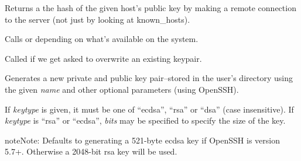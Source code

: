 \documentclass[letterpaper,10pt,openany]{sphinxmanual}
\begin{document}

\begin{fulllineitems}
\label{Applications/terminal/plugin_ssh:ssh.get_host_fingerprint}
Returns a the hash of the given host's public key by making a remote
connection to the server (not just by looking at known\_hosts).

\end{fulllineitems}


\begin{fulllineitems}
\label{Applications/terminal/plugin_ssh:ssh.generate_new_keypair}
Calls {\hyperref[Applications/terminal/plugin_ssh:ssh.openssh_generate_new_keypair]{}} or
{\hyperref[Applications/terminal/plugin_ssh:ssh.dropbear_generate_new_keypair]{}} depending on what's available on the
system.

\end{fulllineitems}


\begin{fulllineitems}
\label{Applications/terminal/plugin_ssh:ssh.overwrite}
Called if we get asked to overwrite an existing keypair.

\end{fulllineitems}


\begin{fulllineitems}
\label{Applications/terminal/plugin_ssh:ssh.openssh_generate_new_keypair}
Generates a new private and public key pair--stored in the user's directory
using the given \emph{name} and other optional parameters (using OpenSSH).

If \emph{keytype} is given, it must be one of ``ecdsa'', ``rsa'' or ``dsa'' (case
insensitive).  If \emph{keytype} is ``rsa'' or ``ecdsa'', \emph{bits} may be specified to
specify the size of the key.

\begin{notice}{note}{Note:}
Defaults to generating a 521-byte ecdsa key if OpenSSH is version 5.7+. Otherwise a 2048-bit rsa key will be used.
\end{notice}

\end{fulllineitems}
\end{document}

